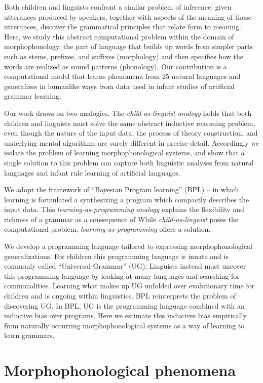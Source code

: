 \documentclass{article}
\begin{document}
Both children and linguists confront a similar problem of inference:
given utterances produced by speakers, together with aspects of the
meaning of those utterances, discover the grammatical principles that
relate form to meaning. Here, we study this abstract computational
problem within the domain of morphophonology, the part of language
that builds up words from simpler parts such as stems, prefixes, and
suffixes (morphology) and then specifies how the words are realized as
sound patterns (phonology).  Our contribution is a computational model
that learns phenomena from 25 natural languages and generalizes in
humanlike ways from data used in infant studies of artificial grammar
learning.

Our work draws on two analogies. The \emph{child-as-linguist analogy}
holds that both children and linguists must solve the same abstract
inductive reasoning problem, even though the nature of the input data,
the process of theory construction, and underlying mental algorithms
are surely different in precise detail. Accordingly we isolate the
problem of learning morphophonological systems, and show that a single
solution to this problem can capture both linguistic analyses from
natural languages and infant rule learning of artificial languages.

We adopt the framework of ``Bayesian Program learning'' (BPL) -- in
which learning is formulated a synthesizing a program which compactly
describes the input data. This \emph{learning-as-programming analogy}
explains the flexibility and richness of a grammar
as a consequence of 
While \emph{child-as-linguist} poses the
computational problem, \emph{learning-as-programming} offers a
solution.

We develop a programming language tailored to expressing
morphophonological generalizations.
For children this programming language is innate and is
commonly called ``Universal Grammar'' (UG). Linguists instead must
uncover this programming language by looking at many languages and
searching for commonalities. Learning what makes up UG unfolded over
evolutionary time for children and is ongoing within linguistics.  BPL
reinterprets the problem of discovering UG.  In BPL, UG is the
programming language combined with an inductive bias over programs.
Here we estimate this inductive bias empirically from naturally
occurring morphophonological systems as a way of learning to learn
grammars.

\section{Morphophonological phenomena}
\end{document}
